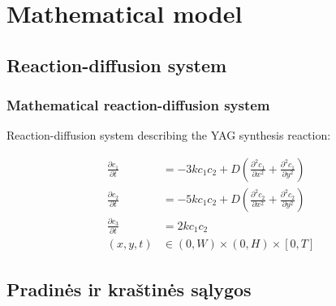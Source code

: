 \documentclass{beamer}
\begin{document}
\section{Mathematical model}

\subsection{Reaction-diffusion system}

\begin{frame}
  \frametitle{Mathematical reaction-diffusion system}

  Reaction-diffusion system describing the YAG synthesis reaction:
  
  \begin{align*}
    \frac{\partial c_1}{\partial t} & =-3kc_1c_2+D\left(\frac{\partial^2c_1}{\partial x^2}+\frac{\partial^2c_1}{\partial y^2}\right) \\
    \frac{\partial c_2}{\partial t} & =-5kc_1c_2+D\left(\frac{\partial^2c_2}{\partial x^2}+\frac{\partial^2c_2}{\partial y^2}\right)\\
    \frac{\partial c_3}{\partial t} & =2kc_1c_2\\
    (x, y, t)&\in(0, W)\times(0, H)\times[0, T]
  \end{align*}

\end{frame}

\subsection{Pradinės ir kraštinės sąlygos}
\end{document}
